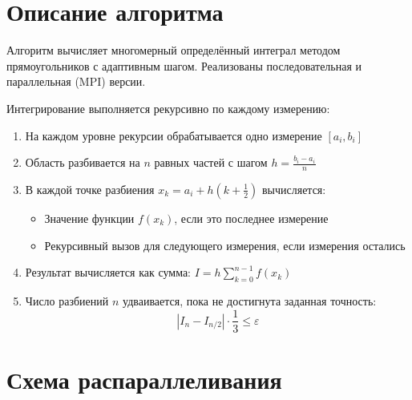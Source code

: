 \documentclass[12pt]{article}
\begin{document}
\newpage
\section{Описание алгоритма}

Алгоритм вычисляет многомерный определённый интеграл методом прямоугольников с адаптивным шагом. Реализованы последовательная и параллельная (MPI) версии.

Интегрирование выполняется рекурсивно по каждому измерению:

\begin{enumerate}
    \item На каждом уровне рекурсии обрабатывается одно измерение $[a_i,b_i]$
    \item Область разбивается на $n$ равных частей с шагом $h = \frac{b_i-a_i}{n}$
    \item В каждой точке разбиения $x_k = a_i + h(k+\frac{1}{2})$ вычисляется:
    \begin{itemize}
        \item Значение функции $f(x_k)$, если это последнее измерение
        \item Рекурсивный вызов для следующего измерения, если измерения остались
    \end{itemize}
    \item Результат вычисляется как сумма: $I = h\sum_{k=0}^{n-1} f(x_k)$
    \item Число разбиений $n$ удваивается, пока не достигнута заданная точность:
     \[ |I_{n} - I_{n/2}| \cdot \frac{1}{3} \leq \varepsilon \] 
\end{enumerate}

\newpage
\section{Схема распараллеливания}
\end{document}
